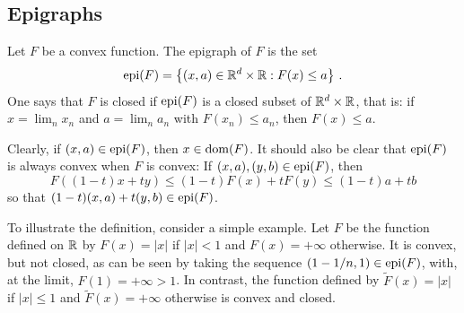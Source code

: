 \subsection{Epigraphs}
\begin{definition}
\label{def:epi}
Let $F$ be a convex function. The  epigraph of $F$ is the set 
\begin{equation}
\mathrm{epi}(F) = \left\{ (x,a)\in {\mathbb{R}}^d \times {\mathbb{R}}: F(x)\leq a \right\}\,.
\label{eq:epi}
\end{equation}
One says that $F$ is closed if $\mathrm{epi}(F)$
is a closed subset of ${\mathbb{R}}^d\times {\mathbb{R}}$, that is: if $x = \lim_n x_n$ and $a = \lim_n a_n$ with $F(x_n) \leq a_n$, then $F(x) \leq a$.  
\end{definition}
Clearly, if $(x,a)\in \mathrm{epi}(F)$, then $x\in \mathrm{dom}(F)$. It should also be clear that $\mathrm{epi}(F)$ is always convex when $F$ is convex: If $(x,a), (y,b) \in \mathrm{epi}(F)$, then 
\[
F((1-t) x + t y) \leq (1-t) F(x) + t F(y) \leq (1-t)a + tb
\]
so that $(1-t)(x,a) + t(y,b) \in \mathrm{epi}(F)$. 

%
%
%



To illustrate the definition, consider a simple example.
Let $F$ be the function defined on ${\mathbb{R}}$ by $F(x) = |x|$ if $|x| < 1$ and $F(x) = +\infty$ otherwise. It is convex, but not closed, as can be seen by taking the sequence $(1-1/n,1)\in \mathrm{epi}(F)$, with, at the limit, $F(1) = +\infty > 1$. In contrast, the function defined by  $\tilde F(x) = |x|$ if $|x| \leq 1$ and $\tilde F(x) = +\infty$ otherwise is convex and closed. 


